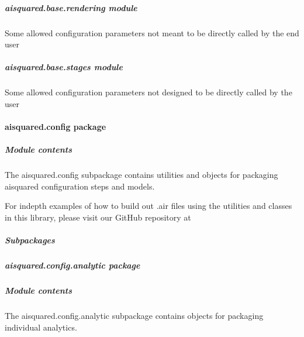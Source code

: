 \documentclass[letterpaper,10pt,english]{sphinxmanual}
\begin{document}
\subparagraph{aisquared.base.rendering module}
\label{\detokenize{aisquared.base:module-aisquared.base.rendering}}\label{\detokenize{aisquared.base:aisquared-base-rendering-module}}
\sphinxAtStartPar
Some allowed configuration parameters \sphinxhyphen{} not meant to be directly called by the end user


\subparagraph{aisquared.base.stages module}
\label{\detokenize{aisquared.base:module-aisquared.base.stages}}\label{\detokenize{aisquared.base:aisquared-base-stages-module}}
\sphinxAtStartPar
Some allowed configuration parameters \sphinxhyphen{} not designed to be directly called by the user

\sphinxstepscope


\paragraph{aisquared.config package}
\label{\detokenize{aisquared.config:aisquared-config-package}}\label{\detokenize{aisquared.config::doc}}

\subparagraph{Module contents}
\label{\detokenize{aisquared.config:module-aisquared.config}}\label{\detokenize{aisquared.config:module-contents}}
\sphinxAtStartPar
The aisquared.config subpackage contains utilities and objects for packaging aisquared configuration steps and models.

\sphinxAtStartPar
For in\sphinxhyphen{}depth examples of how to build out .air files using the utilities and classes in this library, please visit our
GitHub repository at 


\subparagraph{Subpackages}
\label{\detokenize{aisquared.config:subpackages}}
\sphinxstepscope


\subparagraph{aisquared.config.analytic package}
\label{\detokenize{aisquared.config.analytic:aisquared-config-analytic-package}}\label{\detokenize{aisquared.config.analytic::doc}}

\subparagraph{Module contents}
\label{\detokenize{aisquared.config.analytic:module-aisquared.config.analytic}}\label{\detokenize{aisquared.config.analytic:module-contents}}
\sphinxAtStartPar
The aisquared.config.analytic subpackage contains objects for packaging individual analytics.
\end{document}
